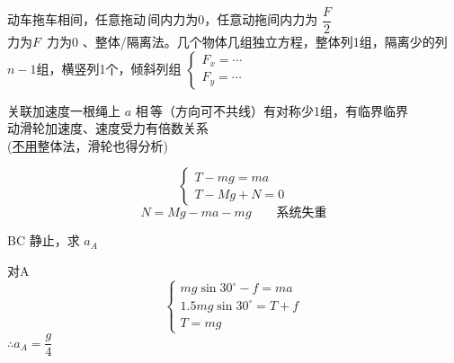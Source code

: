 \noindent 动车拖车相间，任意拖动\,间内力为0，任意动拖间内力为 $\dfrac F2$ \\
力为$F$\ 力为0
、整体/隔离法。几个物体几组独立方程，整体列1组，隔离少的列$n-1$组，横竖列1个，倾斜列组 \quad $\begin{cases}F_x=\cdots\\ F_y=\cdots\end{cases}$

\medskip
\noindent 关联加速度\quad 一根绳上 $a$ 相\,等（方向可不共线）\qquad 有对称少1组，有临界临界 \\
动滑轮加速度、速度受力有倍数关系 \\
(\underline{不用}整体法，滑轮也得分析)
\begin{problem}
\begin{solution}
\[ \begin{cases} T-mg=ma\\ T-Mg+N=0\end{cases} \]
\[ N=Mg-ma-mg\qquad\text{系统失重} \]
\end{solution}
\end{problem}
\begin{problem}
BC 静止，求 $a_A$
\begin{solution}
对A
\[ \begin{cases} mg\sin30^\circ-f=ma\\ 1.5mg\sin30^\circ=T+f\\ T=mg\end{cases} \]
$\therefore a_A=\dfrac g4$
\end{solution}
\end{problem}
